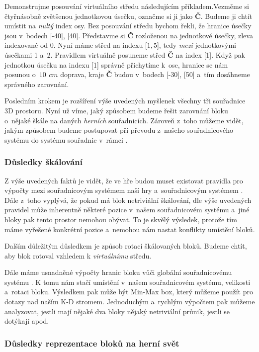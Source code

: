 Demonstrujme posouvání virtuálního středu následujícím příkladem.\linebreak Vezměme si čtyřnásobně zvětšenou jednotkovou úsečku, označme si ji jako \textbf{Č}. Budeme ji chtít umístit na \textit{nultý} index osy. Bez posouvání středu bychom řekli, že hranice úsečky jsou v~bodech [-40], [40]. Představme si \textbf{Č} rozloženou na jednotkové úsečky, zleva indexované od 0. Nyní máme střed na indexu [$1,5$], tedy \textit{mezi} jednotkovými úsečkami 1 a~2. Pravidlem  virtuálně posuneme střed \textbf{Č} na index [1]. Když pak jednotkou úsečku na indexu [1] správně přichytíme k~ose, hranice se nám posunou o~$10\,\ cm$ doprava, kraje \textbf{Č} budou v~bodech [-30], [50] a~tím dosáhneme správného zarovnání.

Posledním krokem je rozšíření výše uvedených myšlenek všechny tři souřadnice 3D prostoru. Nyní už víme, jaký způsobem budeme řešit zarovnání bloku o~nějaké škále na daných \textit{herních} souřadnicích. Zároveň z~toho můžeme vidět, jakým způsobem budeme postupovat při převodu z~našeho souřadnicového systému do systému souřadnic v~rámci \UEu{}.
 
\subsubsection{Důsledky škálování}

Z výše uvedených faktů je vidět, že ve hře budou muset existovat pravidla pro výpočty mezi souřadnicovým systémem naší hry a~souřadnicovým systémem \UEu{}. Dále z~toho vyplývá, že pokud má blok netriviální škálování, dle výše uvedených pravidel může inherentně  některé pozice v~našem souřadnicovém systému a~jiné bloky pak tento prostor nemohou obývat. To je skvělý výsledek, protože tím máme vyřešené konkrétní pozice a~nemohou nám nastat konflikty umístění bloků.

Dalším důležitým důsledkem je způsob rotací škálovaných bloků. Budeme chtít, aby blok rotoval vzhledem k \textit{virtuálnímu} středu. 

Dále máme usnadněné výpočty hranic bloku vůči globální souřadnicovému systému \UEu{}. K tomu nám stačí umístění v~našem souřadnicovém systému, velikosti a~rotaci bloku. Výsledkem pak může být Min-Max box, který můžeme použít pro dotazy nad naším K-D stromem. Jednoduchým a~rychlým výpočtem pak můžeme analyzovat, jestli mají nějaké dva bloky nějaký netriviální průnik, jestli se dotýkají apod.


\subsubsection{Důsledky reprezentace bloků na herní svět}

